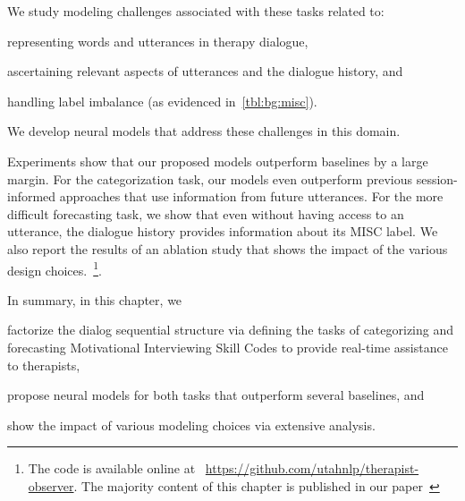 We study modeling challenges associated with these tasks related to:
\begin{inparaenum}[(1)]
\item representing words and utterances in therapy dialogue,
\item ascertaining relevant aspects of utterances and the dialogue
  history, and
\item handling label imbalance (as evidenced in~\autoref{tbl:bg:misc}).
\end{inparaenum}
We develop neural models that address these challenges in this
domain.

Experiments show that our proposed models outperform baselines by a
large margin. For the categorization task, our models even outperform
previous session-informed approaches that use information from future
utterances. For the more difficult forecasting task, we show that even
without having access to an utterance, the dialogue history provides
information about its MISC label.  We also report the results of an
ablation study that shows the impact of the various design
choices.~\footnote{The code is available online at
  ~\url{https://github.com/utahnlp/therapist-observer}. The majority
  content of this chapter is published in our
  paper~\cite{jie2019psycdialacl}}.

In summary, in this chapter, we
\begin{inparaenum}[(1)]
\item factorize the dialog sequential structure via defining the tasks
  of categorizing and forecasting Motivational Interviewing Skill
  Codes to provide real-time assistance to therapists,
\item propose neural models for both tasks that outperform several
  baselines, and
\item show the impact of various modeling choices via extensive
  analysis.
\end{inparaenum}
















